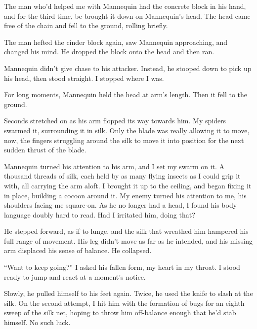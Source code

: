 The man who'd helped me with Mannequin had the concrete block in his hand, and for the third time, be brought it down on Mannequin's head.  The head came free of the chain and fell to the ground, rolling briefly.



The man hefted the cinder block again, saw Mannequin approaching, and changed his mind.  He dropped the block onto the head and then ran.



Mannequin didn't give chase to his attacker.  Instead, he stooped down to pick up his head, then stood straight.  I stopped where I was.



For long moments, Mannequin held the head at arm's length.  Then it fell to the ground.



Seconds stretched on as his arm flopped its way towards him.  My spiders swarmed it, surrounding it in silk.  Only the blade was really allowing it to move, now, the fingers struggling around the silk to move it into position for the next sudden thrust of the blade.



Mannequin turned his attention to his arm, and I set my swarm on it.  A thousand threads of silk, each held by as many flying insects as I could grip it with, all carrying the arm aloft.  I brought it up to the ceiling, and began fixing it in place, building a cocoon around it.  My enemy turned his attention to me, his shoulders facing me square-on.  As he no longer had a head, I found his body language doubly hard to read.  Had I irritated him, doing that?



He stepped forward, as if to lunge, and the silk that wreathed him hampered his full range of movement.  His leg didn't move as far as he intended, and his missing arm displaced his sense of balance.  He collapsed.



``Want to keep going?'' I asked his fallen form, my heart in my throat.  I stood ready to jump and react at a moment's notice.



Slowly, he pulled himself to his feet again.  Twice, he used the knife to slash at the silk.  On the second attempt, I hit him with the formation of bugs for an eighth sweep of the silk net, hoping to throw him off-balance enough that he'd stab himself.  No such luck.



